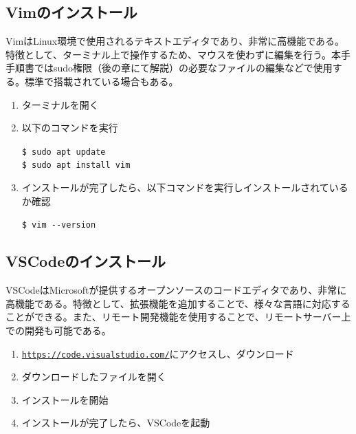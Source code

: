 \documentclass[a4paper, 11pt, dvipdfmx]{jsarticle}
\begin{document}
\subsection{Vimのインストール}
  VimはLinux環境で使用されるテキストエディタであり、非常に高機能である。特徴として、ターミナル上で操作するため、マウスを使わずに編集を行う。本手手順書ではsudo権限（後の章にて解説）の必要なファイルの編集などで使用する。標準で搭載されている場合もある。
  \begin{enumerate}
    \item ターミナルを開く
    \item 以下のコマンドを実行
    \begin{terminalbox}
      \verb|$ sudo apt update|\\
      \verb|$ sudo apt install vim|
    \end{terminalbox}
    \item インストールが完了したら、以下コマンドを実行しインストールされているか確認
    \begin{terminalbox}
      \verb|$ vim --version|
    \end{terminalbox}
  \end{enumerate}

\subsection{VSCodeのインストール}
  VSCodeはMicrosoftが提供するオープンソースのコードエディタであり、非常に高機能である。特徴として、拡張機能を追加することで、様々な言語に対応することができる。また、リモート開発機能を使用することで、リモートサーバー上での開発も可能である。
  \begin{enumerate}
    \item \href{https://code.visualstudio.com/}{\texttt{https://code.visualstudio.com/}}にアクセスし、ダウンロード
    \item ダウンロードしたファイルを開く
    \item インストールを開始
    \item インストールが完了したら、VSCodeを起動
  \end{enumerate}
\end{document}
